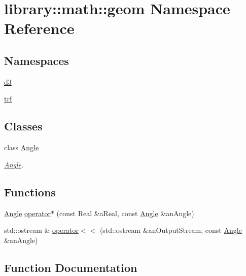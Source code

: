 \hypertarget{namespacelibrary_1_1math_1_1geom}{}\section{library\+:\+:math\+:\+:geom Namespace Reference}
\label{namespacelibrary_1_1math_1_1geom}
\subsection*{Namespaces}
\begin{DoxyCompactItemize}
\item 
 \hyperlink{namespacelibrary_1_1math_1_1geom_1_1d3}{d3}
\item 
 \hyperlink{namespacelibrary_1_1math_1_1geom_1_1trf}{trf}
\end{DoxyCompactItemize}
\subsection*{Classes}
\begin{DoxyCompactItemize}
\item 
class \hyperlink{classlibrary_1_1math_1_1geom_1_1_angle}{Angle}
\begin{DoxyCompactList}\small\item\em \hyperlink{classlibrary_1_1math_1_1geom_1_1_angle}{Angle}. \end{DoxyCompactList}\end{DoxyCompactItemize}
\subsection*{Functions}
\begin{DoxyCompactItemize}
\item 
\hyperlink{classlibrary_1_1math_1_1geom_1_1_angle}{Angle} \hyperlink{namespacelibrary_1_1math_1_1geom_a7f77c4f8d55dbd419a7a9b19aba9a00d}{operator$\ast$} (const Real \&a\+Real, const \hyperlink{classlibrary_1_1math_1_1geom_1_1_angle}{Angle} \&an\+Angle)
\item 
std\+::ostream \& \hyperlink{namespacelibrary_1_1math_1_1geom_adeb31e2f219ef8195271d7655dedd3b8}{operator$<$$<$} (std\+::ostream \&an\+Output\+Stream, const \hyperlink{classlibrary_1_1math_1_1geom_1_1_angle}{Angle} \&an\+Angle)
\end{DoxyCompactItemize}


\subsection{Function Documentation}
\mbox{\label{namespacelibrary_1_1math_1_1geom_a7f77c4f8d55dbd419a7a9b19aba9a00d}} 

